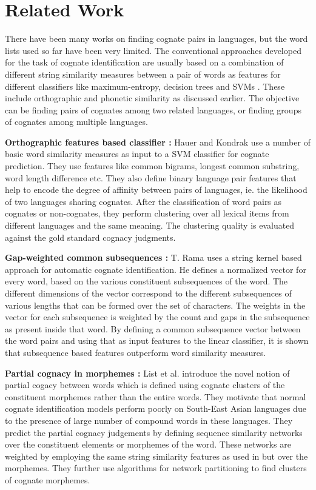 \chapter{Related Work}

There have been many works on finding cognate pairs in languages, but the word lists used so far have been very limited. The conventional approaches developed for the task of cognate identification are usually based on a combination of different string similarity measures between a pair of words as features for different classifiers like maximum-entropy, decision trees and SVMs \cite{inkpen2005automatic}\cite{bergsma2007alignment}. These include orthographic and phonetic similarity as discussed earlier. The objective can be finding pairs of cognates among two related languages, or finding groups of cognates among multiple languages.

\textbf{Orthographic features based classifier : } Hauer and Kondrak \cite{hauer2011clustering} use a number of basic word similarity measures as input to a SVM classifier for cognate prediction. They use features like common bigrams, longest common substring, word length difference etc. They also define binary language pair features that help to encode the degree of affinity between pairs of languages, ie. the likelihood of two languages sharing cognates. After the classification of word pairs as cognates or non-cognates, they perform clustering over all lexical items from different languages and the same meaning. The clustering quality is evaluated against the gold standard cognacy judgments.

\textbf{Gap-weighted common subsequences : } T. Rama \cite{rama2015automatic} uses a string kernel based approach for automatic cognate identification. He defines  a normalized vector for every word, based on the various constituent subsequences of the word. The different dimensions of the vector correspond to the different subsequences of various lengths that can be formed over the set of characters. The weights in the vector for each subsequence is weighted by the count and gaps in the subsequence as present inside that word. By defining a common subsequence vector between the word pairs and using that as input features to the linear classifier, it is shown that subsequence based features outperform word similarity measures.

\textbf{Partial cognacy in morphemes : } List et al. \cite{listusing} introduce the novel notion of partial cogacy between words which is defined using cognate clusters of the constituent morphemes rather than the entire words. They motivate that normal cognate identification models perform poorly on South-East Asian languages due to the presence of large number of compound words in these languages. They predict the partial cognacy judgements by defining sequence similarity networks over the constituent elements or morphemes of the word. These networks are weighted by employing the same string similarity features as used in \cite{hauer2011clustering} but over the morphemes. They further use algorithms for network partitioning to find clusters of cognate morphemes.

